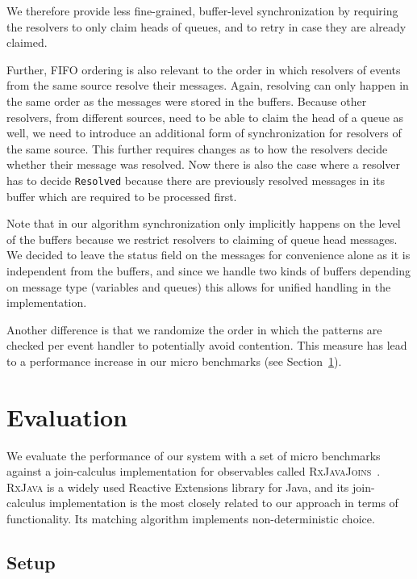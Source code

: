 \documentclass[runningheads]{llncs}
\begin{document}
\begin{sloppypar}
We therefore provide less fine-grained, buffer-level synchronization by
requiring the resolvers to only claim heads of queues, and to retry in case
they are already claimed.

Further, FIFO ordering is also relevant to the order in which resolvers of
events from the same source resolve their messages. Again, resolving can only
happen in the same order as the messages were stored in the buffers. Because
other resolvers, from different sources, need to be able to claim the head of
a queue as well, we need to introduce an additional form of synchronization
for resolvers of the same source. This further requires changes as to how the
resolvers decide whether their message was resolved. Now there is also the
case where a resolver has to decide \texttt{Resolved} because there are
previously resolved messages in its buffer which are required to be processed
first.

Note that in our algorithm synchronization only implicitly happens on the
level of the buffers because we restrict resolvers to claiming of queue head
messages. We decided to leave the status field on the messages for convenience
alone as it is independent from the buffers, and since we handle two kinds of
buffers depending on message type (variables and queues) this allows for
unified handling in the implementation.

Another difference is that we randomize the order in which the patterns are
checked per event handler to potentially avoid contention. This measure has
lead to a performance increase in our micro benchmarks (see
Section~\ref{sec:evaluation}).


\section{Evaluation}\label{sec:evaluation}

We evaluate the performance of our system with a set of micro benchmarks
against a join-calculus implementation for observables called
\textsc{RxJavaJoins}~\cite{RxJavaJoins}. \textsc{RxJava} is a widely used
Reactive Extensions library for Java, and its join-calculus implementation is
the most closely related to our approach in terms of functionality. Its
matching algorithm implements non-deterministic choice.

\subsection{Setup}


\end{sloppypar}
\end{document}
